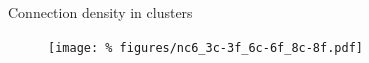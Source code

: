 \begin{frame}{Connection density in clusters}

  \begin{figure}
    \centering
    \texttt{[image: \%
      figures/nc6\_3c-3f\_6c-6f\_8c-8f.pdf]} %
  \end{figure}  
  
\end{frame}
